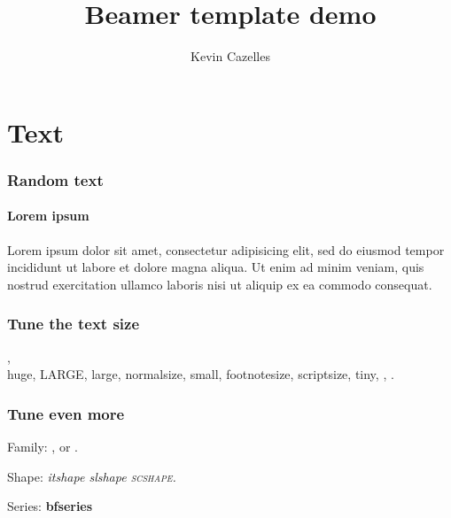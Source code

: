 \documentclass{eecslides}
\title[Beamer template]{Beamer template demo}
\date{}
\author[KevCaz]{Kevin Cazelles}
\institute{Integrative Biology, University of Guelph}
\begin{document}
\begin{frame}
  \titlepage
\end{frame}








\section{Text}


\begin{frame}
    \frametitle{Random text}
    \framesubtitle{Lorem ipsum}
        Lorem ipsum dolor sit amet, consectetur adipisicing elit, sed do eiusmod
        tempor incididunt ut labore et dolore magna aliqua. Ut enim ad minim
        veniam, quis nostrud exercitation ullamco laboris nisi ut aliquip ex
        ea commodo consequat.
\end{frame}



\begin{frame}

  \frametitle{Tune the text size}

    ,\\ \huge{huge}, \LARGE{LARGE},
    \large{large}, \normalsize{normalsize}, \small{small}, \footnotesize{footnotesize}, \scriptsize{scriptsize}, \tiny{tiny}, , .


\end{frame}



\begin{frame}

  \frametitle{Tune even more}

  Family:
  ,  or .

  Shape:
   \itshape{itshape} \slshape{slshape} \scshape{scshape}.

  Series:
  \bfseries{bfseries} 

\end{frame}


\end{document}
